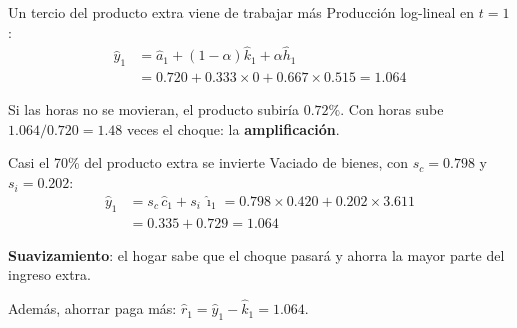 \begin{frame}[label=acto1-producto]{Un tercio del producto extra viene de trabajar más}
  Producción log-lineal en $t=1$:
  \begin{align*}
  \hat y_1&=\hat a_1+(1-\alpha)\hat k_1+\alpha\hat h_1\\
  &=0.720+0.333\times0+0.667\times0.515=\num{1.064}
  \end{align*}
  \par\vspace{0.2cm}
  \centering
  \par\vspace{0.35cm}\raggedright
  Si las horas no se movieran, el producto subiría $0.72\%$. Con horas sube
  $1.064/0.720=1.48$ veces el choque: la \textbf{amplificación}.
\end{frame}

\begin{frame}[label=acto1-reparto]{Casi el 70\% del producto extra se invierte}
  Vaciado de bienes, con $s_c=0.798$ y $s_i=0.202$:
  \begin{align*}
  \hat y_1&=s_c\,\hat c_1+s_i\,\hat\imath_1
  =0.798\times0.420+0.202\times3.611\\
  &=0.335+0.729=\num{1.064}
  \end{align*}
  \par\vspace{0.2cm}
  \centering
  \par\vspace{0.35cm}\raggedright
  \textbf{Suavizamiento}: el hogar sabe que el choque pasará y ahorra la mayor parte del
  ingreso extra.\par
  \vspace{0.2cm}
  Además, ahorrar paga más: $\hat r_1=\hat y_1-\hat k_1=1.064$.
\end{frame}

